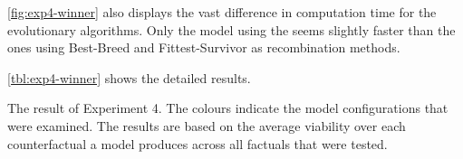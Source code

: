 \documentclass[./../../paper.tex]{subfiles}
\begin{document}
\autoref{fig:exp4-winner} also displays the vast difference in computation time for the evolutionary algorithms. Only the model using the  seems slightly faster than the ones using Best-Breed and Fittest-Survivor as recombination methods.

\autoref{tbl:exp4-winner} shows the detailed results.

\begin{table}
    \caption{The result of Experiment 4. The colours indicate the model configurations that were examined. The results are based on the average viability over each counterfactual a model produces across all factuals that were tested.}
    \label{tbl:exp4-winner}
\makebox[\linewidth]{


}
\end{table}
\end{document}
